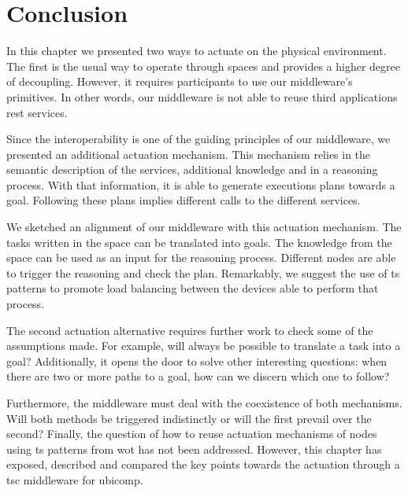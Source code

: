 \section{Conclusion}

In this chapter we presented two ways to actuate on the physical environment.
The first is the usual way to operate through spaces and provides a higher degree of decoupling.
However, it requires participants to use our middleware's primitives. %
In other words, our middleware is not able to reuse third applications \ac{rest} services.


Since the interoperability is one of the guiding principles of our middleware, we presented an additional actuation mechanism.
This mechanism relies in the semantic description of the services, additional knowledge and in a reasoning process. %
With that information, it is able to generate executions plans towards a goal.
Following these plans implies different calls to the different services.


We sketched an alignment of our middleware with this actuation mechanism.
The tasks written in the space can be translated into goals.
The knowledge from the space can be used as an input for the reasoning process.
Different nodes are able to trigger the reasoning and check the plan.
Remarkably, we suggest the use of \ac{ts} patterns to promote load balancing between the devices able to perform that process.


The second actuation alternative requires further work to check some of the assumptions made.
For example, will always be possible to translate a task into a goal?
Additionally, it opens the door to solve other interesting questions: when there are two or more paths to a goal, how can we discern which one to follow?


Furthermore, the middleware must deal with the coexistence of both mechanisms.
Will both methods be triggered indistinctly or will the first prevail over the second?
Finally, the question of how to reuse actuation mechanisms of nodes using \ac{ts} patterns from \ac{wot} has not been addressed.
However, this chapter has exposed, described and compared the key points towards the actuation through a \ac{tsc} middleware for \ac{ubicomp}.